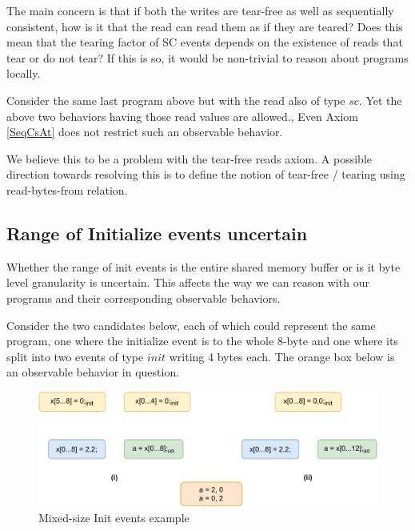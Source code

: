         The main concern is that if both the writes are tear-free as well as sequentially consistent, how is it that the read can read them as if they are teared?
        Does this mean that the tearing factor of SC events depends on the existence of reads that tear or do not tear? 
        If this is so, it would be non-trivial to reason about programs locally.
       
        Consider the same last program above but with the read also of type $sc$. 
        Yet the above two behaviors having those read values are allowed.,
        Even Axiom \ref{SeqCsAt} does not restrict such an observable behavior.

        We believe this to be a problem with the tear-free reads axiom.
        A possible direction towards resolving this is to define the notion of tear-free / tearing using read-bytes-from relation. 

    \subsection{Range of Initialize events uncertain}

        Whether the range of init events is the entire shared memory buffer or is it byte level granularity is uncertain.
        This affects the way we can reason with our programs and their corresponding observable behaviors.

        Consider the two candidates below, each of which could represent the same program, one where the initialize event is to the whole 8-byte and one where its split into two events of type $init$ writing 4 bytes each.
        The orange box below is an observable behavior in question.

        \begin{figure}[H]
            \centering
            \includegraphics[scale=0.7]{7.ConclusionFutureWork/InitExample.pdf}
            \caption{Mixed-size Init events example}
        \end{figure}

